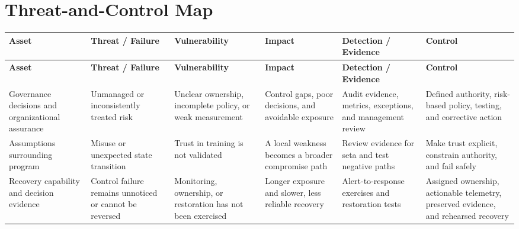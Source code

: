 \documentclass[11pt,letterpaper]{article}
\begin{document}
\section*{Threat-and-Control Map}
\begingroup\scriptsize\setlength{\tabcolsep}{2pt}
\begin{longtable}{>{\raggedright\arraybackslash}p{}>{\raggedright\arraybackslash}p{}>{\raggedright\arraybackslash}p{}>{\raggedright\arraybackslash}p{}>{\raggedright\arraybackslash}p{}>{\raggedright\arraybackslash}p{}}
\toprule\rowcolor{Navy}\color{white}\textbf{Asset} & \color{white}\textbf{Threat / Failure} & \color{white}\textbf{Vulnerability} & \color{white}\textbf{Impact} & \color{white}\textbf{Detection / Evidence} & \color{white}\textbf{Control}\\\midrule
\endfirsthead
\toprule\rowcolor{Navy}\color{white}\textbf{Asset} & \color{white}\textbf{Threat / Failure} & \color{white}\textbf{Vulnerability} & \color{white}\textbf{Impact} & \color{white}\textbf{Detection / Evidence} & \color{white}\textbf{Control}\\\midrule
\endhead
Governance decisions and organizational assurance & Unmanaged or inconsistently treated risk & Unclear ownership, incomplete policy, or weak measurement & Control gaps, poor decisions, and avoidable exposure & Audit evidence, metrics, exceptions, and management review & Defined authority, risk-based policy, testing, and corrective action\\\midrule
Assumptions surrounding program & Misuse or unexpected state transition & Trust in training is not validated & A local weakness becomes a broader compromise path & Review evidence for seta and test negative paths & Make trust explicit, constrain authority, and fail safely\\\midrule
Recovery capability and decision evidence & Control failure remains unnoticed or cannot be reversed & Monitoring, ownership, or restoration has not been exercised & Longer exposure and slower, less reliable recovery & Alert-to-response exercises and restoration tests & Assigned ownership, actionable telemetry, preserved evidence, and rehearsed recovery\\\midrule
\bottomrule
\end{longtable}
\endgroup
\end{document}
